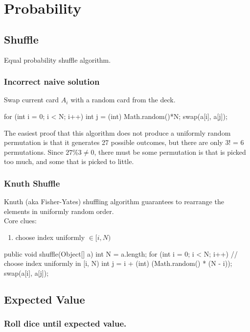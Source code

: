 \chapter{Probability}


\section{Shuffle}
Equal probability shuffle algorithm.

\subsection{Incorrect naive solution}
Swap current card $A_i$ with a random card from the deck. 
\begin{java}
for (int i = 0; i < N; i++) {
   int j = (int) Math.random()*N;
   swap(a[i], a[j]);
}
\end{java}
The easiest proof that this algorithm does not produce a uniformly random permutation is that it generates 27 possible outcomes, but there are only 3! = 6 permutations. Since $27\%3 \neq 0$, there must be some permutation is that is picked too much, and some that is picked to little.
\subsection{Knuth Shuffle}
Knuth (aka Fisher-Yates) shuffling algorithm guarantees to rearrange the elements in uniformly random order. 
\\
Core clues:
\begin{enumerate}
\item choose index uniformly $\in [i, N)$
\end{enumerate}
\begin{java}
public void shuffle(Object[] a) {
    int N = a.length;
    for (int i = 0; i < N; i++) {
        // choose index uniformly in [i, N)
        int j = i + (int) (Math.random() * (N - i));
        swap(a[i], a[j]);
    }
}
\end{java}

\section{Expected Value}
\subsection{Roll dice until expected value.}

